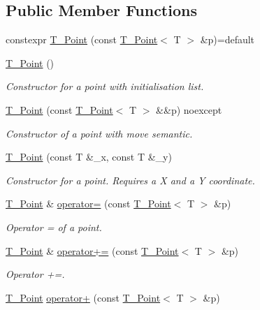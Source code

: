 \subsection*{Public Member Functions}
\begin{DoxyCompactItemize}
\item 
constexpr \hyperlink{classT__Point_af313da04154273b9a75d66e9950359ea}{T\+\_\+\+Point} (const \hyperlink{classT__Point}{T\+\_\+\+Point}$<$ T $>$ \&p)=default
\item 
\hyperlink{classT__Point_a61017b12d3c2aa88a242dbbc57733413}{T\+\_\+\+Point} ()
\begin{DoxyCompactList}\small\item\em Constructor for a point with initialisation list. \end{DoxyCompactList}\item 
\hyperlink{classT__Point_af6c471d7e5547576a6c379930b9d1d35}{T\+\_\+\+Point} (const \hyperlink{classT__Point}{T\+\_\+\+Point}$<$ T $>$ \&\&p) noexcept
\begin{DoxyCompactList}\small\item\em Constructor of a point with move semantic. \end{DoxyCompactList}\item 
\hyperlink{classT__Point_a12f2ef3c5f10e162dcb6385bbfbfae58}{T\+\_\+\+Point} (const T \&\+\_\+x, const T \&\+\_\+y)
\begin{DoxyCompactList}\small\item\em Constructor for a point. Requires a X and a Y coordinate. \end{DoxyCompactList}\item 
\hyperlink{classT__Point}{T\+\_\+\+Point} \& \hyperlink{classT__Point_a13fbb5646f2333aa41194d648423e10f}{operator=} (const \hyperlink{classT__Point}{T\+\_\+\+Point}$<$ T $>$ \&p)
\begin{DoxyCompactList}\small\item\em Operator = of a point. \end{DoxyCompactList}\item 
\hyperlink{classT__Point}{T\+\_\+\+Point} \& \hyperlink{classT__Point_a4fa7b8ceb837c81e608d5ddad0f1ffe7}{operator+=} (const \hyperlink{classT__Point}{T\+\_\+\+Point}$<$ T $>$ \&p)
\begin{DoxyCompactList}\small\item\em Operator +=. \end{DoxyCompactList}\item 
\hyperlink{classT__Point}{T\+\_\+\+Point} \hyperlink{classT__Point_a1f94a7a19cc8711e7784f700ea59297a}{operator+} (const \hyperlink{classT__Point}{T\+\_\+\+Point}$<$ T $>$ \&p)

\end{DoxyCompactItemize}
